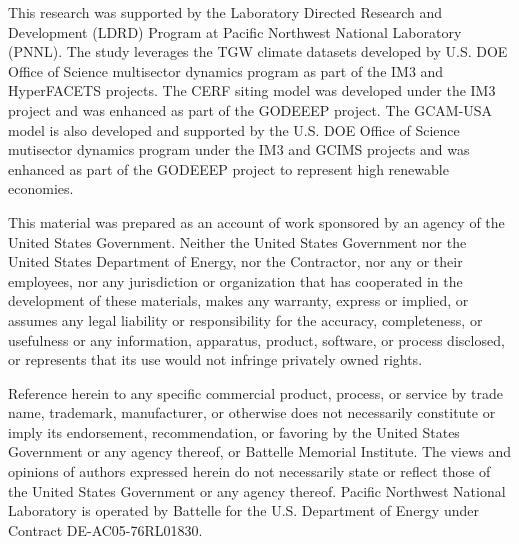 \documentclass{agujournal2019}
\begin{document}
\acknowledgments
This research was supported by the Laboratory Directed Research and Development (LDRD) Program at Pacific Northwest National Laboratory (PNNL). The study leverages the TGW climate datasets developed by U.S. DOE Office of Science multisector dynamics program as part of the IM3 and HyperFACETS projects. The CERF siting model was developed under the IM3 project and was enhanced as part of the GODEEEP project. The GCAM-USA model is also developed and supported by the U.S. DOE Office of Science mutisector dynamics program under the IM3 and GCIMS projects and was enhanced as part of the GODEEEP project to represent high renewable economies.

This material was prepared as an account of work sponsored by an agency of the United States Government.  Neither the United States Government nor the United States Department of Energy, nor the Contractor, nor any or their employees, nor any jurisdiction or organization that has cooperated in the development of these materials, makes any warranty, express or implied, or assumes any legal liability or responsibility for the accuracy, completeness, or usefulness or any information, apparatus, product, software, or process disclosed, or represents that its use would not infringe privately owned rights.

Reference herein to any specific commercial product, process, or service by trade name, trademark, manufacturer, or otherwise does not necessarily constitute or imply its endorsement, recommendation, or favoring by the United States Government or any agency thereof, or Battelle Memorial Institute. The views and opinions of authors expressed herein do not necessarily state or reflect those of the United States Government or any agency thereof.  Pacific Northwest National Laboratory is operated by Battelle for the U.S. Department of Energy under Contract DE-AC05-76RL01830. 


%
%





%
%
%
%
%
\end{document}
